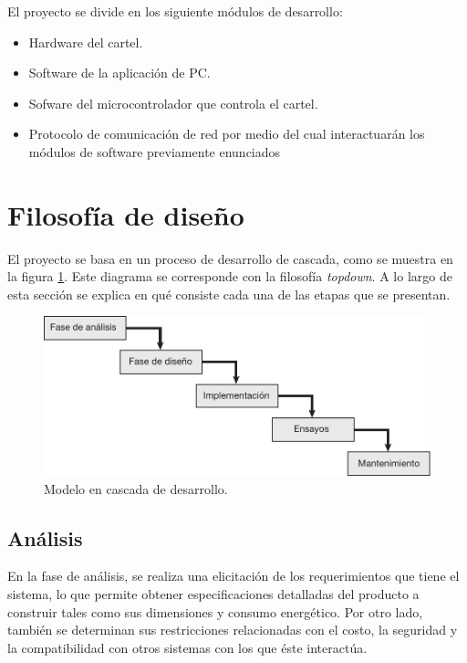 El proyecto se divide en los siguiente módulos de desarrollo:

\begin{itemize}
	\item Hardware del cartel.
	\item Software de la aplicación de PC.
	\item Sofware del microcontrolador que controla el cartel.
	\item Protocolo de comunicación de red por medio del cual interactuarán los módulos de software previamente enunciados
\end{itemize}


\section{Filosofía de diseño} \label{sec:filosofia}
El proyecto se basa en un proceso de desarrollo de cascada, como se muestra en la figura \ref{fig:waterfall}. Este diagrama se corresponde con la filosofía \emph{topdown}. A lo largo de esta sección se explica en qué consiste cada una de las etapas que se presentan.

\begin{figure}[!ht]
	\centering
	\includegraphics[width=1\linewidth]{imagenes/waterfall.pdf}
	\caption{Modelo en cascada de desarrollo.}
	\label{fig:waterfall}
\end{figure}


\subsection{Análisis}
En la fase de análisis, se realiza una elicitación de los requerimientos que tiene el sistema, lo que permite obtener especificaciones detalladas del producto a construir tales como sus dimensiones y consumo energético. Por otro lado, también se determinan sus restricciones relacionadas con el costo, la seguridad y la compatibilidad con otros sistemas con los que éste interactúa.

